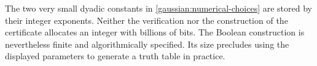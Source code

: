 The two very small dyadic constants in
\eqref{gaussian:numerical-choices} are stored by their integer exponents.
Neither the verification nor the construction of the certificate allocates
an integer with billions of bits.  The Boolean construction is nevertheless
finite and algorithmically specified.  Its size precludes using the displayed
parameters to generate a truth table in practice.
